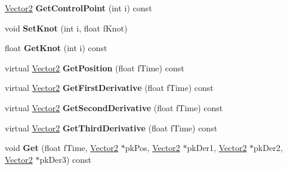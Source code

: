 \begin{DoxyCompactItemize}
\item 
\hyperlink{class_magnum_1_1_vector2}{Vector2} {\bfseries Get\+Control\+Point} (int i) const \hypertarget{class_magnum_1_1_b_spline_curve2_a50b68a972a943ab8121f105da4f59b31}{}\label{class_magnum_1_1_b_spline_curve2_a50b68a972a943ab8121f105da4f59b31}

\item 
void {\bfseries Set\+Knot} (int i, float f\+Knot)\hypertarget{class_magnum_1_1_b_spline_curve2_abf5268c13852a9fa13578d97c434f832}{}\label{class_magnum_1_1_b_spline_curve2_abf5268c13852a9fa13578d97c434f832}

\item 
float {\bfseries Get\+Knot} (int i) const \hypertarget{class_magnum_1_1_b_spline_curve2_ac087bc8aff809be0addfdbc01b53c685}{}\label{class_magnum_1_1_b_spline_curve2_ac087bc8aff809be0addfdbc01b53c685}

\item 
virtual \hyperlink{class_magnum_1_1_vector2}{Vector2} {\bfseries Get\+Position} (float f\+Time) const \hypertarget{class_magnum_1_1_b_spline_curve2_a613fab21c58e31d934d4c5eafc45e09d}{}\label{class_magnum_1_1_b_spline_curve2_a613fab21c58e31d934d4c5eafc45e09d}

\item 
virtual \hyperlink{class_magnum_1_1_vector2}{Vector2} {\bfseries Get\+First\+Derivative} (float f\+Time) const \hypertarget{class_magnum_1_1_b_spline_curve2_a88ad63755648345bf903e9a685718fde}{}\label{class_magnum_1_1_b_spline_curve2_a88ad63755648345bf903e9a685718fde}

\item 
virtual \hyperlink{class_magnum_1_1_vector2}{Vector2} {\bfseries Get\+Second\+Derivative} (float f\+Time) const \hypertarget{class_magnum_1_1_b_spline_curve2_a31b80bd0186efed4856e4099a73169df}{}\label{class_magnum_1_1_b_spline_curve2_a31b80bd0186efed4856e4099a73169df}

\item 
virtual \hyperlink{class_magnum_1_1_vector2}{Vector2} {\bfseries Get\+Third\+Derivative} (float f\+Time) const \hypertarget{class_magnum_1_1_b_spline_curve2_a042ce1937935c0d0c31879afe073ca71}{}\label{class_magnum_1_1_b_spline_curve2_a042ce1937935c0d0c31879afe073ca71}

\item 
void {\bfseries Get} (float f\+Time, \hyperlink{class_magnum_1_1_vector2}{Vector2} $\ast$pk\+Pos, \hyperlink{class_magnum_1_1_vector2}{Vector2} $\ast$pk\+Der1, \hyperlink{class_magnum_1_1_vector2}{Vector2} $\ast$pk\+Der2, \hyperlink{class_magnum_1_1_vector2}{Vector2} $\ast$pk\+Der3) const \hypertarget{class_magnum_1_1_b_spline_curve2_a93cfacd94e8173eced9958ae829cc3fe}{}\label{class_magnum_1_1_b_spline_curve2_a93cfacd94e8173eced9958ae829cc3fe}


\end{DoxyCompactItemize}
